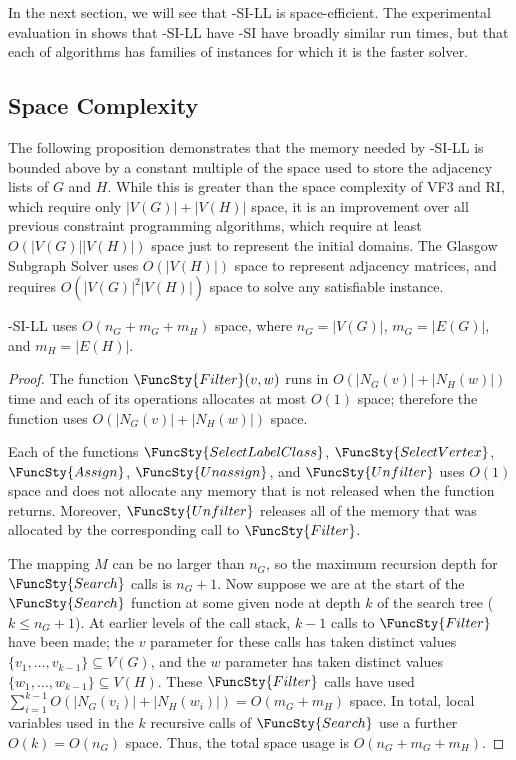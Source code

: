 In the next section, we will see that \McSplit-SI-LL is space-efficient.  The experimental evaluation
in  shows that \McSplit-SI-LL have \McSplit-SI have broadly
similar run times, but that each of algorithms has families of instances for which it is the faster
solver.

\subsection{Space Complexity}\label{sec:mcsplit-si-space-complexity}

The following proposition demonstrates that the memory needed by \McSplit-SI-LL
is bounded above by a constant multiple of the space used to store the adjacency
lists of $G$ and $H$.  While this is greater than the space complexity of 
VF3 and RI, which require only $|V(G)| + |V(H)|$ space, it is an improvement
over all previous constraint programming algorithms, which
require at least $O(|V(G)| |V(H)|)$ space just to represent
the initial domains.  The Glasgow Subgraph Solver uses $O(|V(H)|)$ space
to represent adjacency matrices, and requires $O(|V(G)|^2|V(H)|)$ space
to solve any satisfiable instance.

\begin{proposition}\label{mcsplit-si-space}
    \McSplit-SI-LL uses $O(n_G + m_G + m_H)$ space, where
    $n_G=|V(G)|$,
    $m_G=|E(G)|$, and
    $m_H=|E(H)|$.
\end{proposition}

\begin{proof}
    The function $\FuncSty{Filter}(v,w)$ runs in $O(|N_G(v)| + |N_H(w)|)$ time
    and each of its operations allocates at most $O(1)$ space; therefore the
    function uses $O(|N_G(v)| + |N_H(w)|)$ space.

    Each of the functions
    $\FuncSty{SelectLabelClass}$,
    $\FuncSty{SelectVertex}$,
    $\FuncSty{Assign}$,
    $\FuncSty{Unassign}$,
    and
    $\FuncSty{Unfilter}$
    uses $O(1)$ space and does not allocate any memory that is not released
    when the function returns.  Moreover, $\FuncSty{Unfilter}$ releases
    all of the memory that was allocated by the corresponding call to $\FuncSty{Filter}$.

    The mapping $M$ can be no larger than $n_G$, so the maximum recursion depth for
    $\FuncSty{Search}$ calls is $n_G + 1$.  Now suppose we are at the start of the
    $\FuncSty{Search}$ function at some given node at depth $k$ of the search tree 
    ($k \leq n_G + 1$).  At earlier levels of the call stack, $k-1$ calls to $\FuncSty{Filter}$
    have been made; the $v$ parameter for these calls has taken distinct values
    $\{v_1, \dots, v_{k-1}\} \subseteq V(G)$, and the $w$ parameter has taken distinct values
    $\{w_1, \dots, w_{k-1}\} \subseteq V(H)$.  These $\FuncSty{Filter}$ calls have used
    $\sum_{i=1}^{k-1} O(|N_G(v_i)| + |N_H(w_i)|) = O(m_G + m_H)$ space.  In total,
    local variables used in the $k$
    recursive calls of $\FuncSty{Search}$ use a further $O(k) = O(n_G)$ space.  Thus,
    the total space usage is $O(n_G + m_G + m_H)$.
\end{proof}


